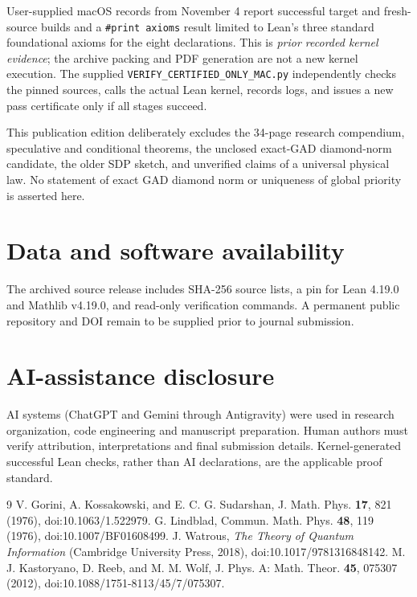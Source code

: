 \documentclass[aps,pra,reprint,superscriptaddress,amsmath,amssymb,floatfix,nofootinbib]{revtex4-2}
\begin{document}
User-supplied macOS records from November 4 report successful target and fresh-source builds and a \texttt{\#print axioms} result limited to Lean's three standard foundational axioms for the eight declarations. This is \emph{prior recorded kernel evidence}; the archive packing and PDF generation are not a new kernel execution. The supplied \texttt{VERIFY\_CERTIFIED\_ONLY\_MAC.py} independently checks the pinned sources, calls the actual Lean kernel, records logs, and issues a new pass certificate only if all stages succeed.

This publication edition deliberately excludes the 34-page research compendium, speculative and conditional theorems, the unclosed exact-GAD diamond-norm candidate, the older SDP sketch, and unverified claims of a universal physical law. No statement of exact GAD diamond norm or uniqueness of global priority is asserted here.

\section*{Data and software availability}
The archived source release includes SHA-256 source lists, a pin for Lean 4.19.0 and Mathlib v4.19.0, and read-only verification commands. A permanent public repository and DOI remain to be supplied prior to journal submission.

\section*{AI-assistance disclosure}
AI systems (ChatGPT and Gemini through Antigravity) were used in research organization, code engineering and manuscript preparation. Human authors must verify attribution, interpretations and final submission details. Kernel-generated successful Lean checks, rather than AI declarations, are the applicable proof standard.

\begin{thebibliography}{9}
 V. Gorini, A. Kossakowski, and E. C. G. Sudarshan, J. Math. Phys. \textbf{17}, 821 (1976), doi:10.1063/1.522979.
 G. Lindblad, Commun. Math. Phys. \textbf{48}, 119 (1976), doi:10.1007/BF01608499.
 J. Watrous, \emph{The Theory of Quantum Information} (Cambridge University Press, 2018), doi:10.1017/9781316848142.
 M. J. Kastoryano, D. Reeb, and M. M. Wolf, J. Phys. A: Math. Theor. \textbf{45}, 075307 (2012), doi:10.1088/1751-8113/45/7/075307.
\end{thebibliography}
\end{document}
